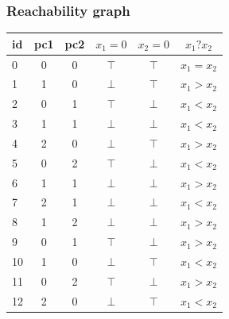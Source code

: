 \documentclass{beamer}
\begin{document}
\begin{frame}
  \frametitle{Reachability graph}

\begin{minipage}{0.65\linewidth}
{\small
\begin{tabular}{l|ccccc}
id & pc1 & pc2 & $x_1=0$ & $x_2=0$ & $x_1 ? x_2$ \\
\hline
0  & 0  &  0  &  $\top$ & $\top$ & $x_1 = x_2$ \\
1  & 1  &  0  &  $\bot$ & $\top$ & $x_1 > x_2$ \\
2  & 0  &  1  &  $\top$ & $\bot$ & $x_1 < x_2$ \\
3  & 1  &  1  &  $\bot$ & $\bot$ & $x_1 < x_2$ \\
4  & 2  &  0  &  $\bot$ & $\top$ & $x_1 > x_2$ \\
5  & 0  &  2  &  $\top$ & $\bot$ & $x_1 < x_2$ \\
6  & 1  &  1  &  $\bot$ & $\bot$ & $x_1 > x_2$ \\
7  & 2  &  1  &  $\bot$ & $\bot$ & $x_1 < x_2$ \\
8  & 1  &  2  &  $\bot$ & $\bot$ & $x_1 > x_2$ \\
9  & 0  &  1  &  $\top$ & $\bot$ & $x_1 > x_2$ \\
10 & 1  &  0  &  $\bot$ & $\top$ & $x_1 < x_2$ \\
11 & 0  &  2  &  $\top$ & $\bot$ & $x_1 > x_2$ \\
12 & 2  &  0  &  $\bot$ & $\top$ & $x_1 < x_2$
\end{tabular}
}
\end{minipage}
\begin{minipage}{0.3\linewidth}

\end{minipage}
\end{frame}
\end{document}
